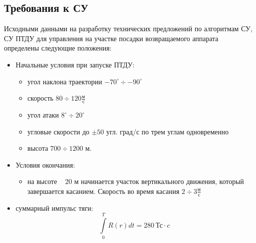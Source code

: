 \clearpage

\subsection{Требования к СУ}
Исходными данными на разработку технических предложений по алгоритмам СУ, СУ ПТДУ для управления на участке посадки возвращаемого аппарата определены следующие положения:
\begin{itemize}
	\item Начальные условия при запуске ПТДУ:
	\begin{itemize}
		\item угол наклона траектории $-70^{\circ} \div -90^{\circ}$
		\item скорость $80 \div 120 \frac{\text{м}}{\text{с}}$
		\item угол атаки $8^{\circ} \div 20^{\circ} $
		\item угловые скорости до $\pm 50$ угл. град/с по трем углам одновременно
		\item высота $700 \div 1200$ м.
	\end{itemize}
	\item Условия окончания:
	\begin{itemize}
		\item на высоте ~ $20$ м начинается участок вертикального движения, который завершается касанием. Скорость во время касания $2 \div 3 \frac{\text{м}}{\text{с}}$
	\end{itemize}
	\item суммарный импульс тяги:
	$$\int \limits_{0}^T R(r) dt = 280 \ \text{Тс} \cdot c$$
\end{itemize}
\clearpage